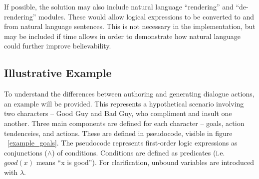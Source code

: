 \documentclass{article}
\begin{document}
If possible, the solution may also include natural language
``rendering'' and ``de-rendering'' modules.  These would allow logical
expressions to be converted to and from natural language sentences.
This is not necessary in the implementation, but may be included if
time allows in order to demonstrate how natural language could further
improve believability.

\subsection{Illustrative Example}

To understand the differences between authoring and generating
dialogue actions, an example will be provided.  This represents a
hypothetical scenario involving two characters -- Good Guy and Bad
Guy, who compliment and insult one another.  Three main components are
defined for each character -- goals, action tendenceies, and
actions.  These are defined in pseudocode, visible in figure
~\ref{example_goals}.  The pseudocode represents first-order logic
expressions as conjunctions ($\wedge$) of conditions.  Conditions
are defined as predicates (i.e. $good(x)$ means ``x is good'').
For clarification, unbound variables are introduced with $\lambda$.
\end{document}
